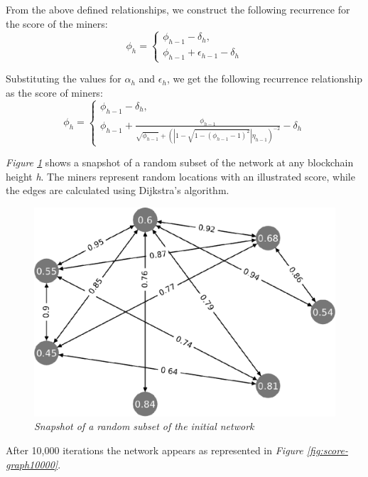 \documentclass[10pt, nonatbib, nocopyrightspace, reprint]{sigplanconf}
\begin{document}
From the above defined relationships, we construct the following recurrence for the score of the miners:
\begin{equation*} \label{score}
	\phi_h = \begin{cases}
		\phi_{h-1} - \delta_h, \\
		\phi_{h-1} + \epsilon_{h-1} - \delta_h
	\end{cases}
\end{equation*}

Substituting the values for $\alpha_h$ and $\epsilon_h$, we get the following recurrence relationship as the score of miners:
\begin{equation*} \label{recurrence}
	\phi_h = \begin{cases}
		\phi_{h-1} - \delta_h,\\
		\phi_{h-1} + \frac{\phi_{h-1}}{\sqrt{\phi_{h-1}} + \left(\left\lvert1 - \sqrt{1 - (\phi_{h-1} - 1)^2}\right\rvert \eta_{h-1}\right)^{-2}} -\delta_h
	\end{cases}
\end{equation*}

\emph{Figure \ref{fig:score-graph}} shows a snapshot of a random subset of the network at any blockchain height \textit{h}. The miners represent random locations with an illustrated score, while the edges are calculated using Dijkstra's algorithm\cite{dijkstra}.

\begin{figure}[H]
    \begin{center}
          \includegraphics[width=0.8\columnwidth]{chart.eps}
          \caption{\emph{Snapshot of a random subset of the initial network}}
          \label{fig:score-graph}
     \end{center}
\end{figure}

After 10,000 iterations the network appears as represented in \emph{Figure \ref{fig:score-graph10000}}.
\end{document}
